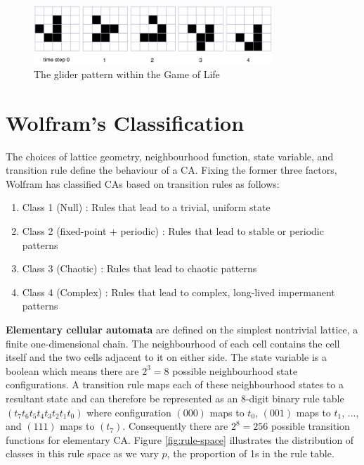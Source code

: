 \begin{figure}[!h]
\centering
\includegraphics[width=0.8\textwidth]{images/life-glider.png}
\caption{The glider pattern within the Game of Life \cite{dorin2012framework}}
\label{fig:life-glider}
\end{figure}

\section{Wolfram's Classification}

The choices of lattice geometry, neighbourhood function, state variable, and transition rule define the behaviour of a CA. Fixing the former three factors, Wolfram \cite{wolfram1986theory} has classified CAs based on transition rules as follows:
\begin{enumerate}
  \item Class 1 (Null) : Rules that lead to a trivial, uniform state
  \item Class 2 (fixed-point + periodic) : Rules that lead to stable or periodic patterns
  \item Class 3 (Chaotic) : Rules that lead to chaotic patterns
  \item Class 4 (Complex) : Rules that lead to complex, long-lived impermanent patterns
\end{enumerate}

\textbf{Elementary cellular automata} are defined on the simplest nontrivial lattice, a finite one-dimensional chain. The neighbourhood of each cell contains the cell itself and the two cells adjacent to it on either side. The state variable is a boolean which means there are $2^3 = 8$ possible neighbourhood state configurations. A transition rule maps each of these neighbourhood states to a resultant state and can therefore be represented as an 8-digit binary rule table $(t_7t_6t_5t_4t_3t_2t_1t_0)$ where configuration $(000)$ maps to $t_0$, $(001)$ maps to $t_1$, ..., and $(111)$ maps to $(t_7)$. Consequently there are $2^8=256$ possible transition functions for elementary CA. Figure \ref{fig:rule-space} illustrates the distribution of classes in this rule space as we vary $p$, the proportion of 1s in the rule table. \\

